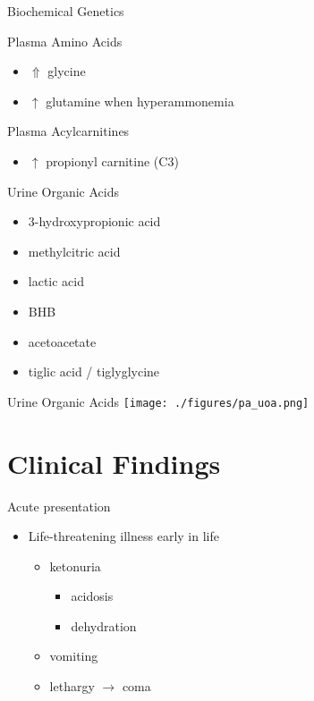 \documentclass[presentation, smaller]{beamer}
\begin{document}
\begin{frame}[label={sec:orgheadline16}]{Biochemical Genetics}
\begin{block}{Plasma Amino Acids}
\begin{itemize}
\item \(\Uparrow\) glycine
\item \(\uparrow\) glutamine when hyperammonemia
\end{itemize}
\end{block}
\begin{block}{Plasma Acylcarnitines}
\begin{itemize}
\item \(\uparrow\) propionyl carnitine (C3)
\end{itemize}
\end{block}
\begin{block}{Urine Organic Acids}
\begin{itemize}
\item 3-hydroxypropionic acid
\item methylcitric acid
\item lactic acid
\item BHB
\item acetoacetate
\item tiglic acid / tiglyglycine
\end{itemize}
\end{block}
\end{frame}

\begin{frame}[label={sec:orgheadline17}]{Urine Organic Acids}
\texttt{[image: ./figures/pa\_uoa.png]}
\end{frame}

\section{Clinical Findings}
\label{sec:orgheadline24}
\begin{frame}[label={sec:orgheadline19}]{Acute presentation}
\begin{itemize}
\item Life-threatening illness early in life
\begin{itemize}
\item ketonuria
\begin{itemize}
\item acidosis
\item dehydration
\end{itemize}
\item vomiting
\item lethargy \(\to\) coma
\end{itemize}
\end{itemize}
\end{frame}
\end{document}
